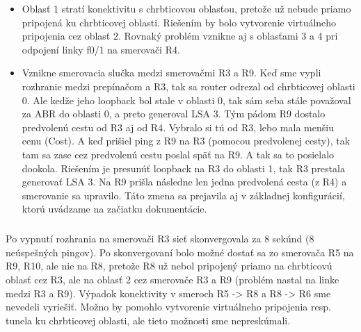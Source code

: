 \documentclass[12pt,twoside,a4paper]{article}
\begin{document}
\begin{itemize}
\item Oblasť 1 stratí konektivitu s chrbticovou oblasťou, pretože už nebude priamo pripojená ku chrbticovej oblasti. Riešením by bolo vytvorenie virtuálneho pripojenia cez oblasť 2. Rovnaký problém vznikne aj s oblasťami 3 a 4 pri odpojení linky f0/1 na smerovači R4.
\item Vznikne smerovacia slučka medzi smerovačmi R3 a R9. Keď sme vypli rozhranie  medzi prepínačom a R3, tak sa router odrezal od chrbticovej oblasti 0. Ale kedže jeho loopback bol stale v oblasti 0, tak sám seba stále považoval za ABR do oblasti 0, a preto generoval LSA 3. Tým pádom R9 dostalo predvolenú cestu od R3 aj od R4. Vybralo si tú od R3, lebo mala menšiu cenu (Cost). A keď prišiel ping z R9 na R3 (pomocou predvolenej cesty), tak tam sa zase cez predvolenú cestu poslal späť na R9. A tak sa to posielalo dookola. Riešením je presunúť loopback na R3 do oblasti 1, tak R3 prestala generovať LSA 3. Na R9 prišla následne len jedna predvolená cesta (z R4) a smerovanie sa upravilo. Táto zmena sa prejavila aj v základnej konfigurácií, ktorú uvádzame na začiatku dokumentácie.
\end{itemize}

\subparagraph{}
Po vypnutí rozhrania  na smerovači R3 sieť skonvergovala za 8 sekúnd (8 neúspešných pingov). Po skonvergovaní bolo možné dostať sa zo smerovača R5 na R9, R10, ale nie na R8, pretože R8 už nebol pripojený priamo na chrbticovú oblasť cez R3, ale na oblasť 2 cez smerovače R3 a R9 (problém nastal na linke medzi R3 a R9). Výpadok konektivity v smeroch R5 -\textgreater{} R8 a R8 -\textgreater{} R6 sme nevedeli vyriešiť. Možno by pomohlo vytvorenie virtuálneho pripojenia resp. tunela ku chrbticovej oblasti, ale tieto možnosti sme nepreskúmali.
\end{document}
